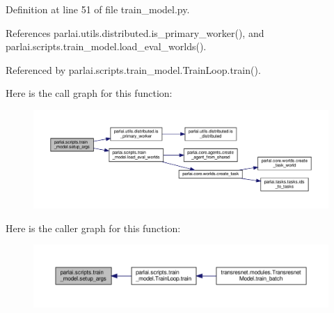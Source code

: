 Definition at line 51 of file train\+\_\+model.\+py.



References parlai.\+utils.\+distributed.\+is\+\_\+primary\+\_\+worker(), and parlai.\+scripts.\+train\+\_\+model.\+load\+\_\+eval\+\_\+worlds().



Referenced by parlai.\+scripts.\+train\+\_\+model.\+Train\+Loop.\+train().

Here is the call graph for this function\+:
\nopagebreak
\begin{figure}[H]
\begin{center}
\leavevmode
\includegraphics[width=350pt]{namespaceparlai_1_1scripts_1_1train__model_a5130cce2fb2a33694a2537d800ad9e9e_cgraph}
\end{center}
\end{figure}
Here is the caller graph for this function\+:
\nopagebreak
\begin{figure}[H]
\begin{center}
\leavevmode
\includegraphics[width=350pt]{namespaceparlai_1_1scripts_1_1train__model_a5130cce2fb2a33694a2537d800ad9e9e_icgraph}
\end{center}
\end{figure}
